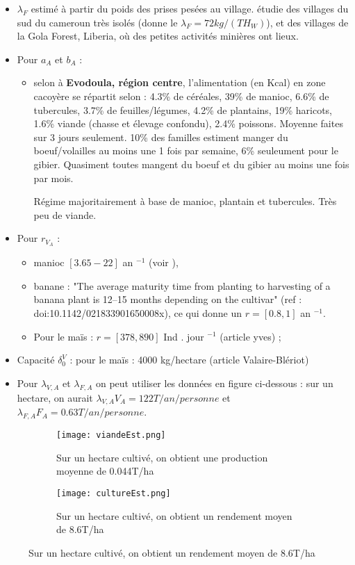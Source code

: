 \documentclass{article}
\newcommand{\lfa}{\lambda_{F, A}}
\newcommand{\lva}{\lambda_{V, A}}
\newcommand{\lfw}{\lambda_{F}}
\newcommand{\dv}{\delta_0^V}
\begin{document}
\begin{itemize}
\item $\lfw$ estimé à partir du poids des prises pesées au village. \cite{avila_interpreting_2019} étudie des villages du sud du cameroun très isolés (donne le $\lfw = 72 kg/(TH_W)$), et \cite{jones_consequences_2020} des villages de la Gola Forest, Liberia, où des petites activités minières ont lieux.

\item Pour $a_A$ et $b_A$ : 

\begin{itemize}
\item selon \cite{alimentation_adie_1996} à \textbf{Evodoula, région centre}, l'alimentation (en Kcal) en zone cacoyère se répartit selon : 4.3\% de céréales, 39\% de manioc, 6.6\% de tubercules, 3.7\% de feuilles/légumes, 4.2\% de plantains, 19\% haricots, 1.6\% viande (chasse et élevage confondu), 2.4\% poissons. Moyenne faites sur 3 jours seulement.
10\% des familles estiment manger du boeuf/volailles au moins une 1 fois par semaine, 6\% seuleument pour le gibier. Quasiment toutes mangent du boeuf et du gibier au moins une fois par mois.

Régime majoritairement à base de manioc, plantain et tubercules. Très peu de viande.
\end{itemize}

\item Pour $r_{V_A}$ : 
\begin{itemize}
\item manioc $[3.65 - 22]$ an $^{-1}$ (voir \cite{chapwanya_application_2021}),
\item banane : "The average maturity time from planting to harvesting of a banana plant is
12–15 months depending on the cultivar" (ref : doi:10.1142/021833901650008x), ce qui donne un $r = [0.8, 1]$ an $^{-1}$.
\item Pour le maïs : $r = [378,890]$ Ind . jour $^{-1}$ (article yves) ;
\end{itemize}  

\item Capacité $\dv$ : pour le maïs : 4000 kg/hectare (article Valaire-Blériot)

\item Pour $\lva$ et $\lfa$ on peut utiliser les données en figure ci-dessous : sur un hectare, on aurait $\lva V_A = 122 T / an / personne$  et $\lfa F_A = 0.63T /an /personne$.

\end{itemize}


\begin{figure}
\centering
\caption{Source : DESA RAPPORT CFSAM 2019 ; 771 755 d'habitants, superficie totale de 109 002km2, densité de 7.1 hab/km2}
\begin{subfigure}{0.49\textwidth}
\texttt{[image: viandeEst.png]}
\caption{Sur un hectare cultivé, on obtient une production moyenne de 0.044T/ha}
\end{subfigure}
\begin{subfigure}{0.49\textwidth}
\texttt{[image: cultureEst.png]}
\caption{Sur un hectare cultivé, on obtient un rendement moyen de 8.6T/ha}
\end{subfigure}
\end{figure}
\end{document}
